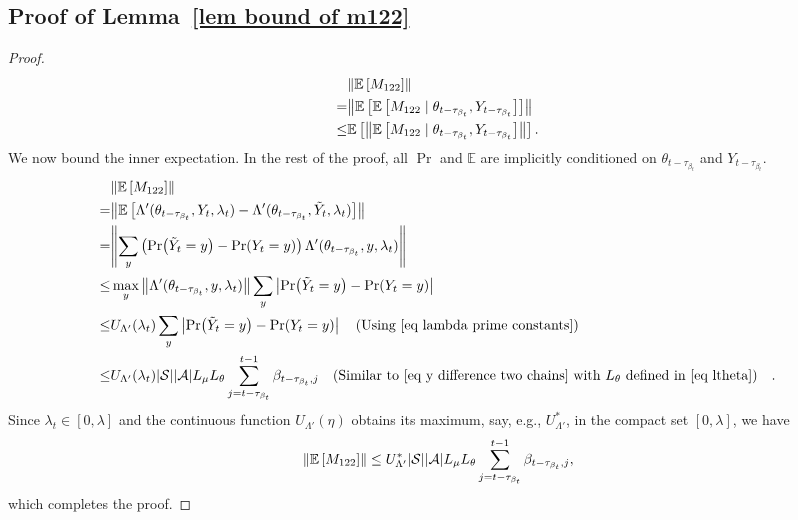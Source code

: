 \documentclass[twoside,11pt]{article}
\newcommand{\fS}{\mathcal{S}}
\newcommand{\fA}{\mathcal{A}}
\newcommand{\E}{\mathbb{E}}
\newcommand{\ns}{{|\fS|}}
\newcommand{\na}{{|\fA|}}
\numberwithin{assucounter}{section}
\begin{document}
\subsection{Proof of Lemma~\ref{lem bound of m122}}
\label{sec proof lem bound of m122}
\lemboundofmonetwotwo*
\begin{proof}
    \begin{align}
      &\norm{\E\left[M_{122}\right]} \\
      =&\norm{\E\left[\E\left[M_{122} \mid \theta_{t-\tau_{\beta_t}}, Y_{t-\tau_{\beta_t}}\right]\right]} \\
      \leq &\E\left[\norm{\E\left[M_{122} \mid \theta_{t-\tau_{\beta_t}}, Y_{t-\tau_{\beta_t}}\right]}\right].
    \end{align}
    We now bound the inner expectation.
    In the rest of the proof,
    all $\Pr$ and $\E$ are implicitly conditioned on $\theta_{t-\tau_{\beta_t}}$ and $Y_{t-\tau_{\beta_t}}$. 
    \begin{align}
        &\norm{\E\left[M_{122}\right]} \\
        =&\norm{\E\left[\Lambda'(\theta_{t-\tau_{\beta_t}}, Y_t, \lambda_t) - \Lambda'(\theta_{t-\tau_{\beta_t}}, \tilde Y_t, \lambda_t)\right]} \\
        = &\norm{\sum_{y} \left(\Pr(\tilde Y_t = y) - \Pr(Y_t = y)\right) \Lambda'(\theta_{t-\tau_{\beta_t}}, y, \lambda_t)} \\
        \leq &\max_y \norm{ \Lambda'(\theta_{t-\tau_{\beta_t}}, y, \lambda_t)}\sum_{y} \left|\Pr(\tilde Y_t = y) - \Pr(Y_t = y)\right| \\
        \leq &U_{\Lambda'}(\lambda_t)\sum_{y} \left|\Pr(\tilde Y_t = y) - \Pr(Y_t = y)\right| \qq{(Using \eqref{eq lambda prime constants})} \\
        \leq &U_{\Lambda'}(\lambda_t) \ns \na L_\mu L_\theta \sum_{j=t-\tau_{\beta_t}}^{t-1} \beta_{t-\tau_{\beta_t}, j} \qq{(Similar to \eqref{eq y difference two chains} with $L_\theta$ defined in \eqref{eq ltheta})}.
    \end{align}
    Since $\lambda_t \in [0, \lambda]$ and the continuous function $U_{\Lambda'}(\eta)$ obtains its maximum, say, e.g., $U_{\Lambda'}^*$, in the compact set $[0, \lambda]$,
    we have
    \begin{align}
      \norm{\E\left[M_{122}\right]} \leq U_{\Lambda'}^* \ns \na L_\mu L_\theta \sum_{j=t-\tau_{\beta_t}}^{t-1} \beta_{t-\tau_{\beta_t}, j},
    \end{align}
    which completes the proof.
\end{proof}
\end{document}

